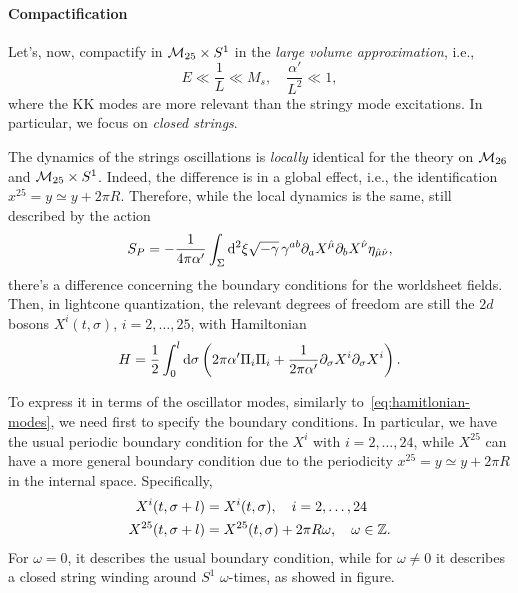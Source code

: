 \paragraph{Compactification}
Let's, now, compactify in $\mathcal{M}_{25} \times S^1$ in the \emph{large volume approximation}, i.e.,
\begin{equation}
    E \ll \frac{1}{L} \ll M_s, \quad \frac{\alpha'}{L^2} \ll 1,
\end{equation}
where the KK modes are more relevant than the stringy mode excitations. In particular, we focus on \emph{closed strings}.

The dynamics of the strings oscillations is \emph{locally} identical for the theory on $\mathcal{M}_{26}$ and $\mathcal{M}_{25} \times S^1$. Indeed, the difference is in a global effect, i.e., the identification $x^{25} = y \simeq y + 2\pi R$. Therefore, while the local dynamics is the same, still described by the action
\begin{equation}
    S_P= -\frac{1}{4\pi\alpha'} \int_\Sigma \mathop{}\!\mathrm{d}^2 \xi \sqrt{-\gamma} \, \gamma^{ab} \partial_a X^{\hat{\mu}} \partial_b X^{\hat{\nu}} \eta_{\hat{\mu}\hat{\nu}} ,
\end{equation}
there's a difference concerning the boundary conditions for the worldsheet fields. Then, in lightcone quantization, the relevant degrees of freedom are still the $2d$ bosons $X^i(t,\sigma)$, $i = 2, \dots, 25$, with Hamiltonian
\begin{equation}
    H = \frac{1}{2} \int_0^l \mathop{}\!\mathrm{d} \sigma \left( 2\pi\alpha' \Pi_i \Pi_i + \frac{1}{2\pi\alpha'} \partial_\sigma X^i \partial_\sigma X^i \right).
\end{equation}

To express it in terms of the oscillator modes, similarly to~\eqref{eq:hamitlonian-modes}, we need first to specify the boundary conditions. In particular, we have the usual periodic boundary condition for the $X^i$ with $i = 2, \dots, 24$, while $X^{25}$ can have a more general boundary condition due to the periodicity $x^{25} = y \simeq y + 2\pi R$ in the internal space. Specifically,
\begin{subequations}
\begin{align}
    X^i(t,\sigma + l) &= X^i(t,\sigma), \quad i = 2, \dots, 24\\
    X^{25}(t,\sigma + l) &= X^{25}(t,\sigma) + 2\pi R \omega, \quad \omega \in \mathbb{Z}.
\end{align}
\end{subequations}
For $\omega = 0$, it describes the usual boundary condition, while for $\omega \neq 0$ it describes a closed string winding around $S^1$ $\omega$-times, as showed in figure.
